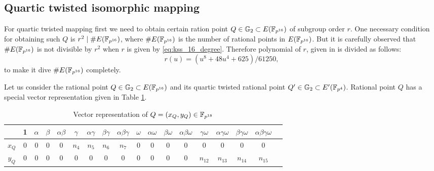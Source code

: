 \subsection{Quartic twisted isomorphic mapping}
For quartic twisted mapping first we need to obtain certain ration point  $Q \in {\mathbb{G}}_{2} \subset E(\mathbb{F}_{p^{16}})$ of subgroup order $r$. 
One necessary condition for obtaining such $Q$ is $r^2 \mid \#E(\mathbb{F}_{p^{16}})$, where $\#E(\mathbb{F}_{p^{16}})$ is the number of rational points in $E(\mathbb{F}_{p^{16}})$.  But it is carefully observed that $\#E(\mathbb{F}_{p^{16}})$ is not divisible by $r^2$ when $r$ is given by \eqref{eq:kss_16_degree}.
 Therefore polynomial of $r$, given in \cite{kss} is divided as follows:
\begin{equation}
r(u) =  (u^8 +48u^4 +625)/61250,
\end{equation}
to make it dive  $\#E(\mathbb{F}_{p^{16}})$ completely.

Let us consider the rational point $Q \in {\mathbb{G}}_{2} \subset E(\mathbb{F}_{p^{16}})$ and its quartic twisted rational point $Q' \in {\mathbb{G}}_{2} \subset E'(\mathbb{F}_{p^4})$. Rational point $Q$ has a special vector representation given in  Table \ref{QKSS16}.

\renewcommand{\baselinestretch}{1.5}
\begin{table}[htb] 
	\begin{center}
		\caption{Vector representation of $Q = (x_Q,y_Q) \in \mathbb{F}_{p^{18}}$}
		\begin{tabular}{|c|c|c|c|c|c|c|c|c|c|c|c|c|c|c|c|c|c|}
			\hline 
			   & 1 & $\alpha$ & $\beta$ & $\alpha \beta$ & $\gamma$ & $\alpha \gamma$ & $\beta \gamma$ & $\alpha \beta \gamma$ & $\omega$ & $\alpha \omega$ & $ \beta \omega$ & $\alpha \beta \omega$ & $\gamma \omega$ & $\alpha \gamma \omega$ &$ \beta \gamma \omega$ & $\alpha \beta \gamma \omega$\\ \hline 
			$x_Q$ & 0 & 0 & 0 & 0 & $n_4$ & $n_5$ &$ n_6$ & $n_7$ & 0 & 0 & 0 & 0 & 0 & 0 & 0& 0\\ \hline 
			$y_Q$ & 0 & 0 & 0 & 0 & 0 & 0 & 0 & 0 & 0 & 0 & 0 & 0 & $n_{12}$ & $n_{13}$ & $n_{14}$ & $n_{15}$\\\hline 
		\end{tabular}\label{QKSS16}
	\end{center}
\end{table}
\renewcommand{\baselinestretch}{1.0}


